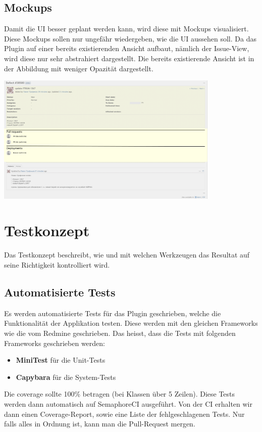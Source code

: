 \begin{minipage}{\textwidth}
  \subsection{Mockups}
  Damit die UI besser geplant werden kann, wird diese mit Mockups visualisiert. Diese Mockups sollen
  nur ungefähr wiedergeben, wie die UI aussehen soll. Da das Plugin auf einer bereits existierenden 
  Ansicht aufbaut, nämlich der Issue-View, wird diese nur sehr abstrahiert dargestellt. \newline
  Die bereits existierende Ansicht ist in der Abbildung mit weniger Opazität dargestellt. \newline
  \begin{center}
    \includegraphics[width=0.8\textwidth]{images/mockup/details.png}
    \label{fig:mockup_details}
  \end{center}
\end{minipage}

\section{Testkonzept}
\label{sec:testkonzept}
Das Testkonzept beschreibt, wie und mit welchen Werkzeugen das Resultat auf seine Richtigkeit kontrolliert wird.

\begin{minipage}{\textwidth}
  \subsection{Automatisierte Tests}
  Es werden automatisierte Tests für das Plugin geschrieben, welche die Funktionalität der Applikation testen.
  Diese werden mit den gleichen Frameworks wie die vom Redmine geschrieben. Das heisst, dass die Tests mit
  folgenden Frameworks geschrieben werden:
  \begin{itemize}
    \item \textbf{MiniTest} für die Unit-Tests
    \item \textbf{Capybara} für die System-Tests
  \end{itemize}
  Die coverage sollte 100\% betragen (bei Klassen über 5 Zeilen). Diese Tests werden dann automatisch auf 
  SemaphoreCI ausgeführt. Von der CI erhalten wir dann einen Coverage-Report, sowie eine Liste der
  fehlgeschlagenen Tests. Nur falls alles in Ordnung ist, kann man die Pull-Request mergen.
\end{minipage}

